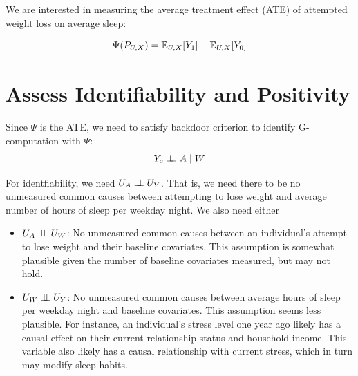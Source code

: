 \documentclass{article}
\begin{document}
We are interested in measuring the average treatment effect (ATE) of attempted weight loss on average sleep:

$$\Psi(P_{U,X}) = \mathbb{E}_{U,X}[Y_1] - \mathbb{E}_{U,X}[Y_0]$$

\section{Assess Identifiability and Positivity}
\label{sec:assumptions}

Since $\Psi$ is the ATE, we need to satisfy backdoor criterion to identify G-computation with $\Psi$:
   $$Y_{a} \perp\hspace{-5pt}\perp A \mid W$$

For identfiability, we need $U_{A} \perp\hspace{-5pt}\perp U_{Y}$. That is, we need there to be no unmeasured common causes between attempting to lose weight and average number of hours of sleep per weekday night. We also need either
    \begin{itemize}
      \item $U_{A} \perp\hspace{-5pt}\perp U_{W}$: No unmeasured common causes between an individual's attempt to lose weight and their baseline covariates. This assumption is somewhat plausible given the number of baseline covariates measured, but may not hold.
      \item $U_{W} \perp\hspace{-5pt}\perp U_{Y}$: No unmeasured common causes between average hours of sleep per weekday night and baseline covariates. This assumption seems less plausible. For instance, an individual's stress level one year ago likely has a causal effect on their current relationship status and household income. This variable also likely has a causal relationship with current stress, which in turn may modify sleep habits.
    \end{itemize}
\end{document}
